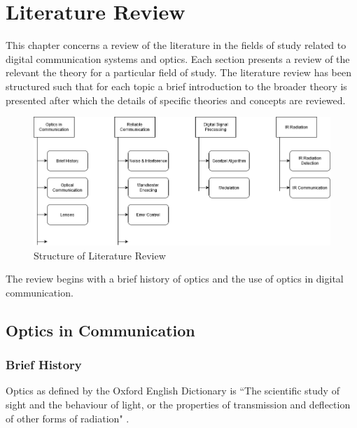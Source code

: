 \chapter{Literature Review}
\label{ch_literature}

This chapter concerns a review of the literature in the fields of study related to digital communication systems and optics.
Each section presents a review of the relevant the theory for a particular field of study. %
The literature review has been structured such that for each topic a brief introduction to the broader theory is presented after which the details of specific theories and concepts are reviewed.

\begin{figure}[H]
	\centering
	\includegraphics[width=\linewidth]{figures/litreview/litreview_overview.png}
	\caption{Structure of Literature Review}
	\label{fig:litreview_overview}
\end{figure}

The review begins with a brief history of optics and the use of optics in digital communication. 

\section{Optics in Communication}

\subsection{Brief History}

Optics as defined by the Oxford English Dictionary is ``The scientific study of sight and the behaviour of light, or the properties of transmission and deflection of other forms of radiation" \cite{oroptics2010}.

